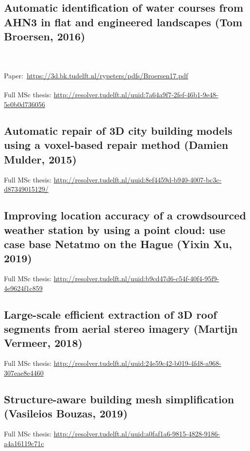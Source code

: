 \subsection{Automatic identification of water courses from AHN3 in flat and engineered landscapes (Tom Broersen, 2016)}

\begin{link-box}
\\ \\
Paper:\ \url{https://3d.bk.tudelft.nl/rypeters/pdfs/Broersen17.pdf}
\\ \\
Full MSc thesis: \url{http://resolver.tudelft.nl/uuid:7a64a9f7-2fef-46b1-9e48-5e0b0d736056}
\end{link-box}

\subsection{Automatic repair of 3D city building models using a voxel-based repair method (Damien Mulder, 2015)}

\begin{link-box}
Full MSc thesis: \url{http://resolver.tudelft.nl/uuid:8ef4459d-b940-4007-bc3c-d87349015129/}
\end{link-box}

\subsection{Improving location accuracy of a crowdsourced weather station by using a point cloud: use case base Netatmo on the Hague (Yixin Xu, 2019)}

\begin{link-box}
Full MSc thesis: \url{http://resolver.tudelft.nl/uuid:b9cd47d6-c54f-40f4-95f9-4e9624f1c859}
\end{link-box}

\subsection{Large-scale efficient extraction of 3D roof segments from aerial stereo imagery (Martijn Vermeer, 2018)}

\begin{link-box}
Full MSc thesis: \url{http://resolver.tudelft.nl/uuid:24e59c42-b019-4fd8-a968-307eae8e4460}
\end{link-box}

\subsection{Structure-aware building mesh simplification (Vasileios Bouzas, 2019)}

\begin{link-box}
Full MSc thesis: \url{http://resolver.tudelft.nl/uuid:a0faf1a6-9815-4828-9186-a4a16119c71c}
\end{link-box}






